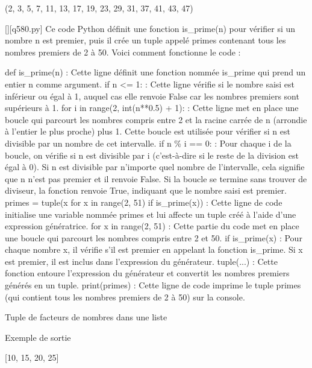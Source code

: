 (2, 3, 5, 7, 11, 13, 17, 19, 23, 29, 31, 37, 41, 43, 47)
        \par
        \begin{solution}
            \renewcommand{\nomfichier}{q580.py}
            \pythonfile{\chemincode \nomfichier}[][\nomfichier]
            Ce code Python définit une fonction is\_prime(n) pour vérifier si un nombre n est premier, puis il crée un tuple appelé primes contenant tous les nombres premiers de 2 à 50. Voici comment fonctionne le code :

    def is\_prime(n) : Cette ligne définit une fonction nommée is\_prime qui prend un entier n comme argument.
        if n <= 1: : Cette ligne vérifie si le nombre saisi est inférieur ou égal à 1, auquel cas elle renvoie False car les nombres premiers sont supérieurs à 1.
        for i in range(2, int(n**0.5) + 1): : Cette ligne met en place une boucle qui parcourt les nombres compris entre 2 et la racine carrée de n (arrondie à l'entier le plus proche) plus 1. Cette boucle est utilisée pour vérifier si n est divisible par un nombre de cet intervalle.
            if n \% i == 0: : Pour chaque i de la boucle, on vérifie si n est divisible par i (c'est-à-dire si le reste de la division est égal à 0). Si n est divisible par n'importe quel nombre de l'intervalle, cela signifie que n n'est pas premier et il renvoie False.
        Si la boucle se termine sans trouver de diviseur, la fonction renvoie True, indiquant que le nombre saisi est premier.
    primes = tuple(x for x in range(2, 51) if is\_prime(x)) : Cette ligne de code initialise une variable nommée primes et lui affecte un tuple créé à l'aide d'une expression génératrice.
        for x in range(2, 51) : Cette partie du code met en place une boucle qui parcourt les nombres compris entre 2 et 50.
        if is\_prime(x) : Pour chaque nombre x, il vérifie s'il est premier en appelant la fonction is\_prime. Si x est premier, il est inclus dans l'expression du générateur.
        tuple(...) : Cette fonction entoure l'expression du générateur et convertit les nombres premiers générés en un tuple.
    print(primes) : Cette ligne de code imprime le tuple primes (qui contient tous les nombres premiers de 2 à 50) sur la console.
        \end{solution}
        

        \question
        Tuple de facteurs de nombres dans une liste

Exemple de sortie

[10, 15, 20, 25]

